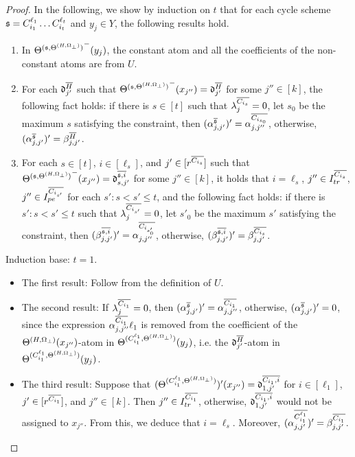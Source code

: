 \begin{appendix}
{\begin{proof}
In the following, we show by induction on $t$ that for each cycle scheme ${\mathfrak{s} }=C^{\ell_1}_{i_1} \dots C^{\ell_t}_{i_t}$ and $y_j \in Y$, the following results hold.
\begin{enumerate}
\item In ${\Theta^{({\mathfrak{s} },\Theta^{(H,\Omega_\bot)})}}^-(y_j)$, the constant atom and all the coefficients of the non-constant atoms are from $U$.
%
\item For each $\mathfrak{d}^{\overline{H}}_{j'}$ such that ${\Theta^{({\mathfrak{s} },\Theta^{(H,\Omega_\bot)})}}^-(x_{j''})=\mathfrak{d}^{\overline{H}}_{j'}$ for some $j''  \in [k]$, the following fact holds: if there is $s \in [t]$ such that $\lambda^{\overline{C_{i_s}}}_j =0$, let $s_0$ be the maximum $s$ satisfying the constraint, then $(\alpha^{\overline{{\mathfrak{s} }}}_{j,j'})'=\alpha^{\overline{C_{i_{s_0}}}}_{j, j''}$, otherwise, $(\alpha^{\overline{{\mathfrak{s} }}}_{j,j'})'= \beta^{\overline{H}}_{j,j'}$.
%
\item For each $s \in [t]$, $i \in [\ell_s]$, and $j' \in [r^{\overline{C_{i_s}}}]$ such that ${\Theta^{({\mathfrak{s} },\Theta^{(H,\Omega_\bot)})}}^-(x_{j''})=\mathfrak{d}^{\overline{{\mathfrak{s} }, i}}_{s, j'}$ for some $j''  \in [k]$, it holds that $i = \ell_s$, $j'' \in I^{\overline{C_{i_s}}}_{tr}$, $j'' \in I^{\overline{C_{i_{s'}}}}_{pe}$ for each $s': s < s' \le t$, and the following fact holds: if there is $s': s < s' \le t$ such that $\lambda^{\overline{C_{i_{s'}}}}_j =0$, let $s'_0$ be the maximum $s'$ satisfying the constraint, then $(\beta^{\overline{{\mathfrak{s} }, i}}_{j,j'})'=\alpha^{\overline{C_{i_{s'_0}}}}_{j, j''}$, otherwise, $(\beta^{\overline{{\mathfrak{s} }, i}}_{j,j'})'= \beta^{\overline{C_{i_s}}}_{j,j'}$. 
\end{enumerate}

Induction base: $t=1$. 
\begin{itemize}
\item The first result: Follow from the definition of $U$. 

\item The second result: If $\lambda^{\overline{C_{i_1}}}_j = 0$, then $(\alpha^{\overline{{\mathfrak{s} }}}_{j,j'})'=\alpha^{\overline{C_{i_{1}}}}_{j, j''}$,  otherwise, $(\alpha^{\overline{{\mathfrak{s} }}}_{j,j'})'=0$, since the expression $\alpha^{\overline{C_{i_1}}}_{j,j''} \ell_1$ is removed from the coefficient of the $\Theta^{(H,\Omega_\bot)}(x_{j''})$-atom in $\Theta^{(C^{\ell_1}_{i_1},\Theta^{(H,\Omega_\bot)})}(y_j)$, i.e. the $\mathfrak{d}^{\overline{H}}_{j'}$-atom in $\Theta^{(C^{\ell_1}_{i_1},\Theta^{(H,\Omega_\bot)})}(y_j)$. 

\item The third result: Suppose that $(\Theta^{(C^{\ell_1}_{i_1},\Theta^{(H,\Omega_\bot)})})'(x_{j''})=\mathfrak{d}^{\overline{C_{i_1}, i}}_{1, j'}$ for $i \in [\ell_1]$, $j' \in [r^{\overline{C_{i_1}}}]$, and $j'' \in [k]$. Then $j'' \in I^{\overline{C_{i_1}}}_{tr}$, otherwise, $\mathfrak{d}^{\overline{C_{i_1}, i}}_{1, j'}$ would not be assigned to $x_{j''}$. From this, we deduce that $i = \ell_s$. Moreover, $(\alpha^{\overline{C^{\ell_1}_{i_1}}}_{j,j'})'= \beta^{\overline{C_{i_1}}}_{j,j'}$. 
\end{itemize}


\end{proof}}
\end{appendix}

